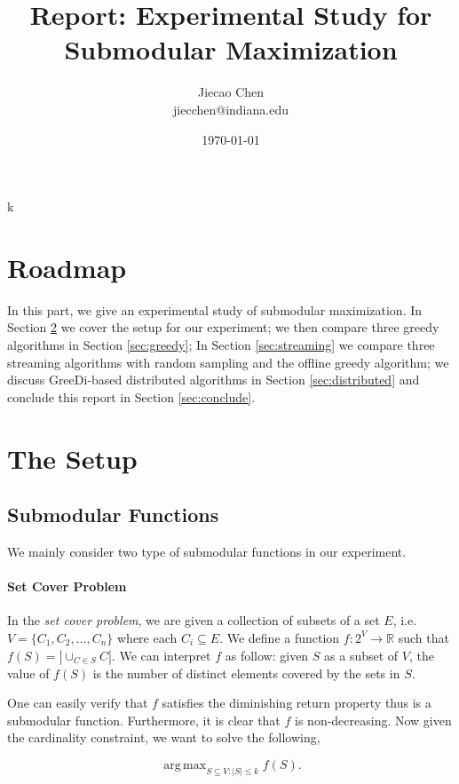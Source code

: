 \documentclass[11pt]{article}
\newcommand{\bbR}{\mathbb{R}}
\DeclareMathOperator*{\argmax}{arg\,max}
\begin{document}
\title{Report: Experimental Study for Submodular Maximization}
\author{Jiecao Chen\\ jiecchen@indiana.edu}
\date{\today}

\maketitle



k\section{Roadmap}
In this part, we give an experimental study of submodular maximization. In Section \ref{sec:setup} we cover the setup for our experiment; we then compare three greedy algorithms in Section \ref{sec:greedy}; In Section \ref{sec:streaming} we compare three streaming algorithms with random sampling and the offline greedy algorithm; we discuss {\sc GreeDi}-based distributed algorithms in Section \ref{sec:distributed} and conclude this report in Section \ref{sec:conclude}.

\section{The Setup}
\label{sec:setup}

\subsection{Submodular Functions}
We mainly consider two type of submodular functions in our experiment.
\paragraph{Set Cover Problem}
In the \emph{set cover problem}, we are given a collection of subsets of a set $E$, i.e. $V = \{C_1, C_2, \ldots, C_n\}$ where each $C_i \subseteq E$. We define a function $f:2^V \rightarrow \bbR$ such that $f(S) = |\cup_{C\in S} C|$. We can interpret $f$ as follow: given $S$ as a subset of $V$, the value of $f(S)$ is the number of distinct elements covered by the sets in $S$.

One can easily verify that $f$ satisfies the diminishing return property thus is a submodular function. Furthermore, it is clear that $f$ is non-decreasing.  Now given the cardinality constraint, we want to solve the following,

$$\argmax_{S\subseteq V: |S|\leq k} f(S).$$
\end{document}
